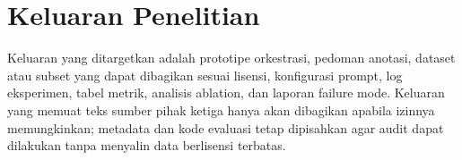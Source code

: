 \section{Keluaran Penelitian}

Keluaran yang ditargetkan adalah prototipe orkestrasi, pedoman anotasi, dataset atau subset yang dapat dibagikan sesuai lisensi, konfigurasi prompt, log eksperimen, tabel metrik, analisis ablation, dan laporan failure mode. Keluaran yang memuat teks sumber pihak ketiga hanya akan dibagikan apabila izinnya memungkinkan; metadata dan kode evaluasi tetap dipisahkan agar audit dapat dilakukan tanpa menyalin data berlisensi terbatas.

